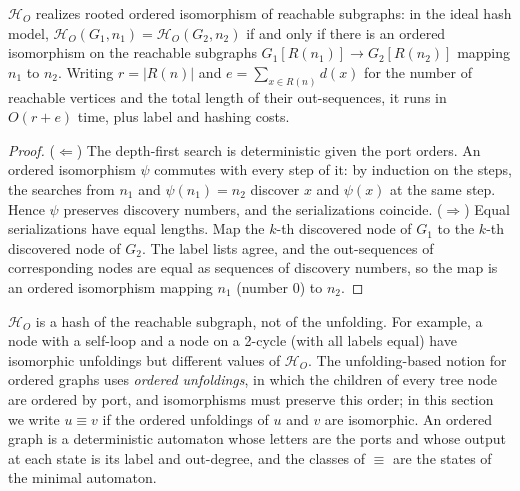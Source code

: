 \documentclass[twoside,leqno]{article}
\newcommand{\HO}{\mathcal{H}_{O}}
\newcommand{\Reach}{R}
\begin{document}
\begin{theorem}
\label{thm:orderedhash}
$\HO$ realizes rooted ordered isomorphism of reachable subgraphs: in the ideal hash model, $\HO(G_1,n_1)=\HO(G_2,n_2)$ if and only if there is an ordered isomorphism on the reachable subgraphs $G_1[\Reach(n_1)]\to G_2[\Reach(n_2)]$ mapping $n_1$ to $n_2$. Writing $r=|\Reach(n)|$ and $e=\sum_{x\in\Reach(n)}d(x)$ for the number of reachable vertices and the total length of their out-sequences, it runs in $O(r+e)$ time, plus label and hashing costs.
\end{theorem}
\begin{proof}
($\Leftarrow$) The depth-first search is deterministic given the port orders. An ordered isomorphism $\psi$ commutes with every step of it: by induction on the steps, the searches from $n_1$ and $\psi(n_1)=n_2$ discover $x$ and $\psi(x)$ at the same step. Hence $\psi$ preserves discovery numbers, and the serializations coincide.
($\Rightarrow$) Equal serializations have equal lengths. Map the $k$-th discovered node of $G_1$ to the $k$-th discovered node of $G_2$. The label lists agree, and the out-sequences of corresponding nodes are equal as sequences of discovery numbers, so the map is an ordered isomorphism mapping $n_1$ (number $0$) to $n_2$.
\end{proof}

$\HO$ is a hash of the reachable subgraph, not of the unfolding. For example, a node with a self-loop and a node on a 2-cycle (with all labels equal) have isomorphic unfoldings but different values of $\HO$. The unfolding-based notion for ordered graphs uses \emph{ordered unfoldings}, in which the children of every tree node are ordered by port, and isomorphisms must preserve this order; in this section we write $u\equiv v$ if the ordered unfoldings of $u$ and $v$ are isomorphic. An ordered graph is a deterministic automaton whose letters are the ports and whose output at each state is its label and out-degree, and the classes of $\equiv$ are the states of the minimal automaton.
\end{document}

